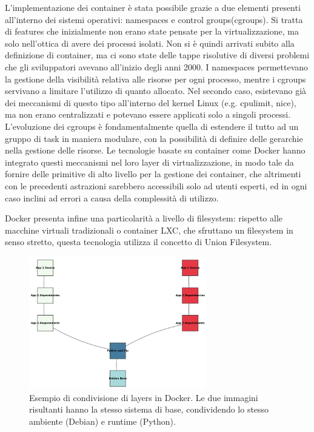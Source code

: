L'implementazione dei container è stata possibile grazie a due elementi presenti all'interno dei sistemi operativi: namespaces e control groups(cgroups). Si tratta di features che inizialmente non erano state pensate per la virtualizzazione, ma solo nell'ottica di avere dei processi isolati. Non si è quindi arrivati subito alla definizione di container, ma ci sono state delle tappe risolutive di diversi problemi che gli sviluppatori avevano all'inizio degli anni 2000. I namespaces permettevano la gestione della visibilità relativa alle risorse per ogni processo, mentre i cgroups servivano a limitare l'utilizzo di quanto allocato. Nel secondo caso, esistevano già dei meccanismi di questo tipo all'interno del kernel Linux (e.g. cpulimit, nice), ma non erano centralizzati e potevano essere applicati solo a singoli processi. L'evoluzione dei cgroups è fondamentalmente quella di estendere il tutto ad un gruppo di task in maniera modulare, con la possibilità di definire delle gerarchie nella gestione delle risorse. Le tecnologie basate su container come Docker hanno integrato questi meccanismi nel loro layer di virtualizzazione, in modo tale da fornire delle primitive di alto livello per la gestione dei container, che altrimenti con le precedenti astrazioni sarebbero accessibili solo ad utenti esperti, ed in ogni caso inclini ad errori a causa della complessità di utilizzo. 

Docker presenta infine una particolarità a livello di filesystem: rispetto alle macchine virtuali tradizionali o container LXC, che sfruttano un filesystem in senso stretto, questa tecnologia utilizza il concetto di Union Filesystem. 

\begin{figure}[htbp]
    \centering
    \includegraphics[width=0.69\textwidth]{figures/docker-image-layers.png}
    \caption{Esempio di condivisione di layers in Docker. Le due immagini risultanti hanno la stesso sistema di base, condividendo lo stesso ambiente (Debian) e runtime (Python).}
    \label{fig:image-layers}
\end{figure}

